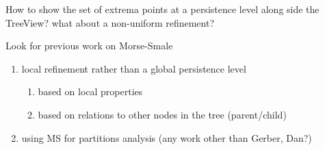 How to show the set of extrema points at a persistence level along side the TreeView?
	what about a non-uniform refinement?

Look for previous work on Morse-Smale 
\begin{enumerate}
\item local refinement rather than a global persistence level
\begin{enumerate}
\item based on local properties 
\item based on relations to other nodes in the tree (parent/child)
\end{enumerate}
\item  using MS for partitions analysis (any work other than Gerber, Dan?)

\end{enumerate}
    